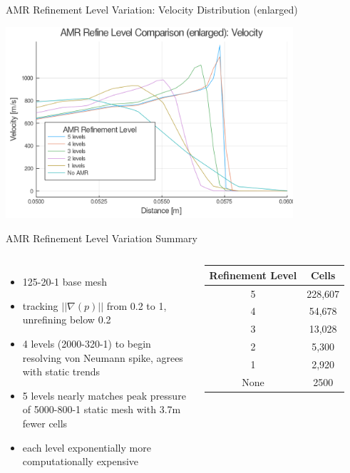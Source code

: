 \begin{frame}{AMR Refinement Level Variation: Velocity Distribution (enlarged)}
\begin{center}
\includegraphics[width=0.8\textwidth]{../figs/amrfigs/amr_refinelevels/ue.png}
\end{center}
\end{frame}

\begin{frame}{AMR Refinement Level Variation Summary}
\begin{columns}
\begin{itemize}
\item 125-20-1 base mesh
\item tracking $||\nabla (p)||$ from 0.2 to 1, unrefining below 0.2
\item 4 levels (2000-320-1) to begin resolving von Neumann spike, agrees with static trends
\item 5 levels nearly matches peak pressure of 5000-800-1 static mesh with 3.7m fewer cells
\item each level exponentially more computationally expensive 
\end{itemize}

\begin{table}[h]
\centering
\begin{tabular}{cc}
Refinement Level & Cells \\ \hline
5 & 228,607 \\ 
4 & 54,678 \\ 
3 & 13,028 \\ 
2 & 5,300 \\
1 & 2,920 \\
None & 2500 \\
\end{tabular}
\end{table}
\end{columns}
\end{frame}

